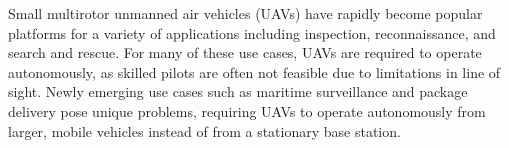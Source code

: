 
Small multirotor unmanned air vehicles (UAVs) have rapidly become popular platforms for
a variety of applications including
inspection, reconnaissance, and search and rescue.
For many of these use cases, UAVs are required to operate
autonomously, as skilled pilots are often not feasible due to
limitations in line of sight. 
Newly emerging use cases such as maritime surveillance and package delivery
pose unique problems, requiring UAVs to operate autonomously from larger,
mobile vehicles instead of from a stationary base station.



